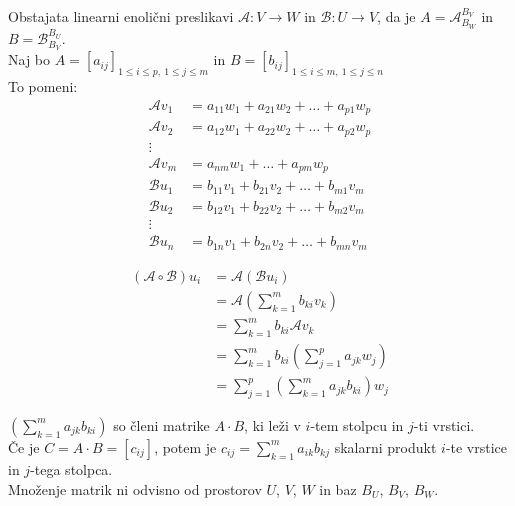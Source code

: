 \documentclass[a4paper,12pt]{article}
\begin{document}
Obstajata linearni enolični preslikavi $\mathcal{A}: V\to W$ in $\mathcal{B}:U\to V$, da je $A=\mathcal{A}_{B_W}^{B_V}$ in $B=\mathcal{B}_{B_V}^{B_U}$. \\

Naj bo $A=[a_{ij}]_{1\leq i \leq p,~1\leq j \leq m}$ in $B=[b_{ij}]_{1\leq i \leq m,~1\leq j \leq n}$ \\

To pomeni:
	\begin{align*}
		\mathcal{A}v_1 &= a_{11}w_1+a_{21}w_2+\ldots+a_{p1}w_p \\
		\mathcal{A}v_2 &= a_{12}w_1+a_{22}w_2+\ldots+a_{p2}w_p \\
		\vdots \\
		\mathcal{A}v_m &= a_{nm}w_1+\ldots+a_{pm}w_p \\
		\mathcal{B}u_1 &= b_{11}v_1+b_{21}v_2+\ldots+b_{m1}v_m \\
		\mathcal{B}u_2 &= b_{12}v_1+b_{22}v_2+\ldots+b_{m2}v_m \\
		\vdots \\
		\mathcal{B}u_n &= b_{1n}v_1+b_{2n}v_2+\ldots+b_{mn}v_m
	\end{align*}

\begin{align*}
	(\mathcal{A}\circ \mathcal{B})u_i &= \mathcal{A}(\mathcal{B} u_i) \\
	&= \mathcal{A}(\sum_{k=1}^m b_{ki}v_k) \\
	&= \sum_{k=1}^m b_{ki}\mathcal{A}v_k \\
	&= \sum_{k=1}^m b_{ki}(\sum_{j=1}^p a_{jk}w_j) \\
	&= \sum_{j=1}^p (\sum_{k=1}^m a_{jk}b_{ki})w_j
\end{align*}

$(\sum_{k=1}^m a_{jk}b_{ki})$ so členi matrike $A\cdot B$, ki leži v $i$-tem stolpcu in $j$-ti vrstici. \\

Če je $C=A\cdot B=[c_{ij}]$, potem je $c_{ij}=\sum_{k=1}^m a_{ik}b_{kj}$ skalarni produkt $i$-te vrstice in $j$-tega stolpca. \\

Množenje matrik ni odvisno od prostorov $U$, $V$, $W$ in baz $B_U$, $B_V$, $B_W$. \\
\end{document}
